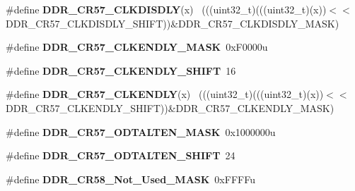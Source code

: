 \begin{DoxyCompactItemize}
\item 
\hypertarget{group___d_d_r___register___masks_gacf4cc3c2a99b0048e20360efaa5482e6}{}\#define {\bfseries D\+D\+R\+\_\+\+C\+R57\+\_\+\+C\+L\+K\+D\+I\+S\+D\+L\+Y}(x)                                    ~(((uint32\+\_\+t)(((uint32\+\_\+t)(x))$<$$<$D\+D\+R\+\_\+\+C\+R57\+\_\+\+C\+L\+K\+D\+I\+S\+D\+L\+Y\+\_\+\+S\+H\+I\+F\+T))\&D\+D\+R\+\_\+\+C\+R57\+\_\+\+C\+L\+K\+D\+I\+S\+D\+L\+Y\+\_\+\+M\+A\+S\+K)\label{group___d_d_r___register___masks_gacf4cc3c2a99b0048e20360efaa5482e6}

\item 
\hypertarget{group___d_d_r___register___masks_gade02246dfbb43fcd8080ef4a02183bcd}{}\#define {\bfseries D\+D\+R\+\_\+\+C\+R57\+\_\+\+C\+L\+K\+E\+N\+D\+L\+Y\+\_\+\+M\+A\+S\+K}~0x\+F0000u\label{group___d_d_r___register___masks_gade02246dfbb43fcd8080ef4a02183bcd}

\item 
\hypertarget{group___d_d_r___register___masks_ga12e64c3301603d3b5daa8d4a57499e3d}{}\#define {\bfseries D\+D\+R\+\_\+\+C\+R57\+\_\+\+C\+L\+K\+E\+N\+D\+L\+Y\+\_\+\+S\+H\+I\+F\+T}~16\label{group___d_d_r___register___masks_ga12e64c3301603d3b5daa8d4a57499e3d}

\item 
\hypertarget{group___d_d_r___register___masks_gaed7cf5132aba1c6d2d4d053541cfcd37}{}\#define {\bfseries D\+D\+R\+\_\+\+C\+R57\+\_\+\+C\+L\+K\+E\+N\+D\+L\+Y}(x)                                      ~(((uint32\+\_\+t)(((uint32\+\_\+t)(x))$<$$<$D\+D\+R\+\_\+\+C\+R57\+\_\+\+C\+L\+K\+E\+N\+D\+L\+Y\+\_\+\+S\+H\+I\+F\+T))\&D\+D\+R\+\_\+\+C\+R57\+\_\+\+C\+L\+K\+E\+N\+D\+L\+Y\+\_\+\+M\+A\+S\+K)\label{group___d_d_r___register___masks_gaed7cf5132aba1c6d2d4d053541cfcd37}

\item 
\hypertarget{group___d_d_r___register___masks_ga80ed3ce99b48193e7c1fb781bdc57caf}{}\#define {\bfseries D\+D\+R\+\_\+\+C\+R57\+\_\+\+O\+D\+T\+A\+L\+T\+E\+N\+\_\+\+M\+A\+S\+K}~0x1000000u\label{group___d_d_r___register___masks_ga80ed3ce99b48193e7c1fb781bdc57caf}

\item 
\hypertarget{group___d_d_r___register___masks_gae87d9bd95d54a3ec43dcfb4e6c5c8bba}{}\#define {\bfseries D\+D\+R\+\_\+\+C\+R57\+\_\+\+O\+D\+T\+A\+L\+T\+E\+N\+\_\+\+S\+H\+I\+F\+T}~24\label{group___d_d_r___register___masks_gae87d9bd95d54a3ec43dcfb4e6c5c8bba}

\item 
\hypertarget{group___d_d_r___register___masks_gac68a9931fb5a4984123707d60c9832f6}{}\#define {\bfseries D\+D\+R\+\_\+\+C\+R58\+\_\+\+Not\+\_\+\+Used\+\_\+\+M\+A\+S\+K}~0x\+F\+F\+F\+Fu\label{group___d_d_r___register___masks_gac68a9931fb5a4984123707d60c9832f6}


\end{DoxyCompactItemize}
